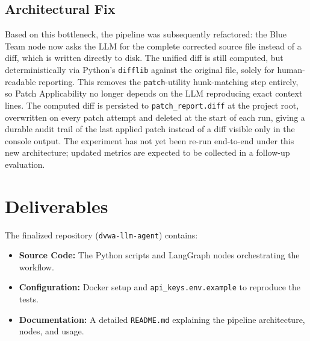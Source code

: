\documentclass[11pt,a4paper]{article}
\begin{document}
\subsection*{Architectural Fix}
Based on this bottleneck, the pipeline was subsequently refactored: the Blue Team node now asks the LLM for the complete corrected source file instead of a diff, which is written directly to disk. The unified diff is still computed, but deterministically via Python's \texttt{difflib} against the original file, solely for human-readable reporting. This removes the \texttt{patch}-utility hunk-matching step entirely, so Patch Applicability no longer depends on the LLM reproducing exact context lines. The computed diff is persisted to \texttt{patch\_report.diff} at the project root, overwritten on every patch attempt and deleted at the start of each run, giving a durable audit trail of the last applied patch instead of a diff visible only in the console output. The experiment has not yet been re-run end-to-end under this new architecture; updated metrics are expected to be collected in a follow-up evaluation.

\section{Deliverables}
The finalized repository (\texttt{dvwa-llm-agent}) contains:
\begin{itemize}
    \item \textbf{Source Code:} The Python scripts and LangGraph nodes orchestrating the workflow.
    \item \textbf{Configuration:} Docker setup and \texttt{api\_keys.env.example} to reproduce the tests.
    \item \textbf{Documentation:} A detailed \texttt{README.md} explaining the pipeline architecture, nodes, and usage.
\end{itemize}
\end{document}
